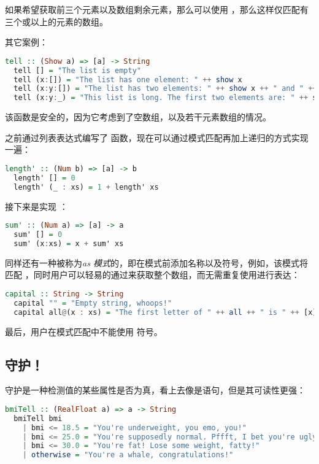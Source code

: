 \documentclass[./main.tex]{subfiles}
\begin{document}
如果希望获取前三个元素以及数组剩余元素，那么可以使用 ，那么这样仅匹配有三个或以上的元素的数组。

其它案例：

\begin{lstlisting}[language=Haskell]
  tell :: (Show a) => [a] -> String
  tell [] = "The list is empty"
  tell (x:[]) = "The list has one element: " ++ show x
  tell (x:y:[]) = "The list has two elements: " ++ show x ++ " and " ++ show y
  tell (x:y:_) = "This list is long. The first two elements are: " ++ show x ++ " and " ++ show y
\end{lstlisting}

该函数是安全的，因为它考虑到了空数组，以及若干元素数组的情况。

之前通过列表表达式编写了  函数，现在可以通过模式匹配再加上递归的方式实现一遍：

\begin{lstlisting}[language=Haskell]
  length' :: (Num b) => [a] -> b
  length' [] = 0
  length' (_ : xs) = 1 + length' xs
\end{lstlisting}

接下来是实现 ：

\begin{lstlisting}[language=Haskell]
  sum' :: (Num a) => [a] -> a
  sum' [] = 0
  sum' (x:xs) = x + sum' xs
\end{lstlisting}

同样还有一种被称为\textit{as 模式}的，即在模式前添加名称以及符号，例如，该模式将匹配
，同时用户可以轻易的通过来获取整个数组，而无需重复使用进行表达：

\begin{lstlisting}[language=Haskell]
  capital :: String -> String
  capital "" = "Empty string, whoops!"
  capital all@(x : xs) = "The first letter of " ++ all ++ " is " ++ [x]
\end{lstlisting}

最后，用户在模式匹配中不能使用 \acode{++} 符号。

\subsection*{守护！}

守护是一种检测值的某些属性是否为真，看上去像是语句，但是其可读性更强：

\begin{lstlisting}[language=Haskell]
  bmiTell :: (RealFloat a) => a -> String
  bmiTell bmi
    | bmi <= 18.5 = "You're underweight, you emo, you!"
    | bmi <= 25.0 = "You're supposedly normal. Pffft, I bet you're ugly!"
    | bmi <= 30.0 = "You're fat! Lose some weight, fatty!"
    | otherwise = "You're a whale, congratulations!"
\end{lstlisting}
\end{document}

